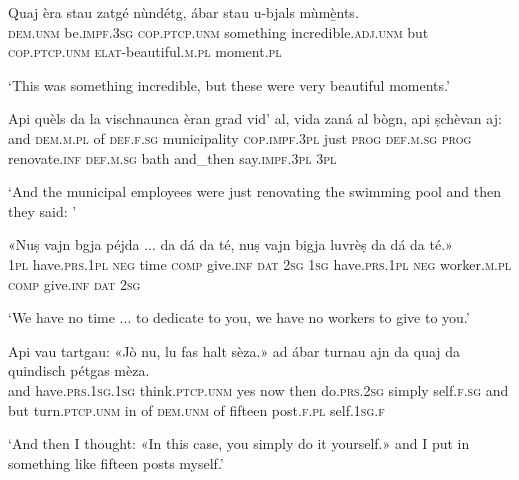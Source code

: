 \begin{linenumbers}
\gll  Quaj èra stau zatgé nùndétg, ábar stau u-bjals mùmè̱nts.\\
 \textsc{dem.unm} be.\textsc{impf.3sg} \textsc{cop.ptcp.unm} something incredible.\textsc{adj.unm} but \textsc{cop.ptcp.unm}  \textsc{elat}-beautiful.\textsc{m.pl} moment.\textsc{pl} \\
\end{linenumbers}
\medskip
\glt `This was something incredible, but these were very beautiful moments.'
\medskip

\begin{linenumbers}
\gll  Api quèls da la vischnaunca èran grad vid' al, vida zaná al bògn, api ṣchèvan aj:  \\
and \textsc{dem.m.pl} of \textsc{def.f.sg} municipality \textsc{cop.impf.3pl} just \textsc{prog} \textsc{def.m.sg} \textsc{prog} renovate.\textsc{inf} \textsc{def.m.sg} bath and\_then say.\textsc{impf.3pl} \textsc{3pl} \\
\end{linenumbers}
\medskip
\glt `And the municipal employees were just renovating the swimming pool and then they said: '
\medskip

\begin{linenumbers}
\gll «Nuṣ vajn bgja péjda ... da dá da té, nuṣ vajn bigja luvrèṣ da dá da té.»   \\
 \textsc{1pl} have.\textsc{prs.1pl} \textsc{neg} time {} \textsc{comp} give.\textsc{inf} \textsc{dat} \textsc{2sg} \textsc{1sg} have.\textsc{prs.1pl} \textsc{neg} worker.\textsc{m.pl} \textsc{comp} give.\textsc{inf} \textsc{dat} \textsc{2sg}\\
\end{linenumbers}
\medskip
\glt `We have no time ... to dedicate to you, we have no workers to give to you.'
\medskip

\begin{linenumbers}
\gll  Api vau tartgau: «Jò nu\footnotemark, lu fas halt sèza.» ad ábar turnau ajn da quaj da quindisch pétgas mèza.  \\
and have.\textsc{prs.1sg.1sg} think.\textsc{ptcp.unm} yes now then  do.\textsc{prs.2sg} simply self.\textsc{f.sg} and but turn.\textsc{ptcp.unm} in of \textsc{dem.unm} of fifteen post.\textsc{f.pl} self.\textsc{1sg.f} \\
\end{linenumbers}
\medskip
\glt `And then I thought: «In this case, you simply do it yourself.» and I put in something like fifteen posts myself.'
\medskip

